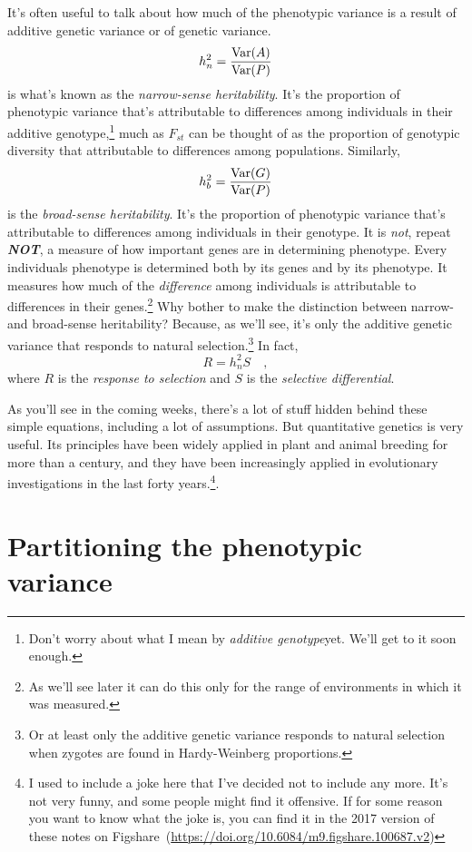 \documentclass[12pt]{article}
\begin{document}
It's often useful to talk about how much of the phenotypic variance is
a result of additive genetic variance or of genetic variance.
\[
h^2_n = \frac{\mbox{Var}(A)}{\mbox{Var}(P)}
\]
is what's known as the {\it narrow-sense heritability}. It's the
proportion of phenotypic variance that's attributable to differences
among individuals in their additive genotype,\footnote{Don't worry
  about what I mean by {\it additive genotype}{\dash}yet. We'll get to
  it soon enough.} much as $F_{st}$ can be thought of as the
proportion of genotypic diversity that attributable to differences
among populations. Similarly,
\[
h^2_b = \frac{\mbox{Var}(G)}{\mbox{Var}(P)}
\]
is the {\it broad-sense heritability}. It's the proportion of
phenotypic variance that's attributable to differences among
individuals in their genotype. It is {\it not}, repeat {\bf\it NOT}, a
measure of how important genes are in determining phenotype. Every
individuals phenotype is determined both by its genes and by its
phenotype. It measures how much of the {\it difference\/} among
individuals is attributable to differences in their genes.\footnote{As
  we'll see later it can do this only for the range of environments in
  which it was measured.} Why bother
to make the distinction between narrow- and broad-sense heritability?
Because, as we'll see, it's only the additive genetic variance that
responds to natural selection.\footnote{Or at least only the additive
  genetic variance responds to natural selection when zygotes are
  found in Hardy-Weinberg proportions.} In fact,
\[
R = h^2_nS \quad ,
\]
where $R$ is the {\it response to selection\/} and $S$ is the
{\it selective differential}.

As you'll see in the coming weeks, there's a lot of stuff hidden
behind these simple equations, including a lot of assumptions. But
quantitative genetics is very useful. Its principles have been widely
applied in plant and animal breeding for more than a century, and they
have been increasingly applied in evolutionary investigations in the
last forty years.\footnote{I used to include a joke here that I've
  decided not to include any more. It's not very funny, and some
  people might find it offensive. If for some reason you want to know
  what the joke is, you can find it in the 2017 version of these notes
  on Figshare~(\url{https://doi.org/10.6084/m9.figshare.100687.v2})}.

\section*{Partitioning the phenotypic variance}
\end{document}
